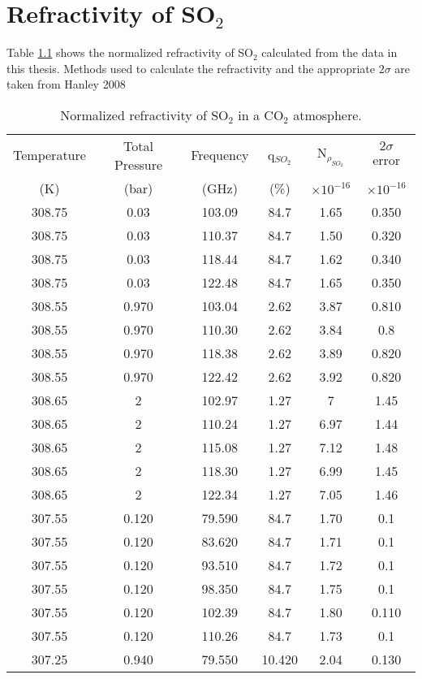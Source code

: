 \chapter{Refractivity of SO$_2$}

Table \ref{long} shows the normalized refractivity of SO$_2$ calculated from the data in this thesis. Methods used to calculate the refractivity and the appropriate $2\sigma$ are taken from Hanley 2008 \cite{Hanley-thesis}

\begin{longtable}{||c|c|c|c|c|c||}
\caption[An optional table caption ...]{Normalized refractivity of SO$_2$ in a CO$_2$ atmosphere. \label{long}}\\
\hline
Temperature &Total Pressure & Frequency & q$_{SO_2}$ & N$_{\rho_{SO_2}}$ & $2\sigma$ error \\
(K) &(bar) & (GHz) &(\%) & $\times 10^{-16}$&$\times 10^{-16}$\\
\hline
308.75	&0.03	&103.09	&84.7	&1.65	&0.350\\
308.75	&0.03	&110.37	&84.7	&1.50	&0.320\\
308.75	&0.03	&118.44	&84.7	&1.62	&0.340\\
308.75	&0.03	&122.48	&84.7	&1.65	&0.350\\
308.55	&0.970	&103.04	&2.62	&3.87	&0.810\\
308.55	&0.970	&110.30	&2.62	&3.84	&0.8\\
308.55	&0.970	&118.38	&2.62	&3.89	&0.820\\
308.55	&0.970	&122.42	&2.62	&3.92	&0.820\\
308.65	&2		&102.97	&1.27	&7		&1.45\\
308.65	&2		&110.24	&1.27	&6.97	&1.44\\
308.65	&2		&115.08	&1.27	&7.12	&1.48\\
308.65	&2		&118.30	&1.27	&6.99	&1.45\\
308.65	&2		&122.34	&1.27	&7.05	&1.46\\
307.55	&0.120	&79.590	&84.7	&1.70	&0.1\\
307.55	&0.120	&83.620	&84.7	&1.71	&0.1\\
307.55	&0.120	&93.510	&84.7	&1.72	&0.1\\
307.55	&0.120	&98.350	&84.7	&1.75	&0.1\\
307.55	&0.120	&102.39	&84.7	&1.80	&0.110\\
307.55	&0.120	&110.26	&84.7	&1.73	&0.1\\
307.25	&0.940	&79.550	&10.420	&2.04	&0.130\\

\end{longtable}
